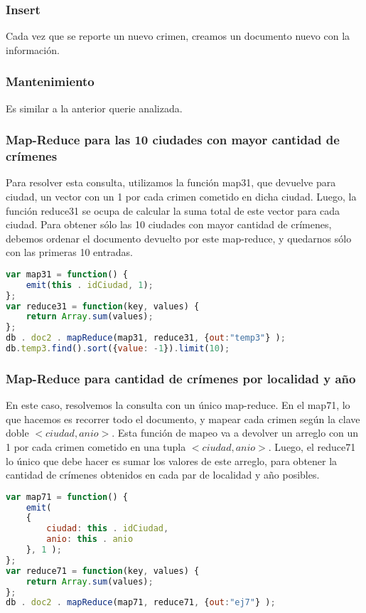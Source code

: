 \documentclass[11pt, a4paper]{article}
\begin{document}
\subsubsection{Insert}

Cada vez que se reporte un nuevo crimen, creamos un documento nuevo con la informaci\'on.

\subsubsection{Mantenimiento}

Es similar a la anterior querie analizada.

\subsubsection{Map-Reduce para las 10 ciudades con mayor cantidad de crímenes}

Para resolver esta consulta, utilizamos la función map31, que devuelve para ciudad, un vector con un 1 por cada crimen cometido en dicha ciudad. Luego, la función reduce31 se ocupa de calcular la suma total de este vector para cada ciudad. Para obtener sólo las 10 ciudades con mayor cantidad de crímenes, debemos ordenar el documento devuelto por este map-reduce, y quedarnos sólo con las primeras 10 entradas.

\begin{lstlisting}[language=JavaScript]
var map31 = function() {
    emit(this . idCiudad, 1);
};
var reduce31 = function(key, values) {
    return Array.sum(values);
};
db . doc2 . mapReduce(map31, reduce31, {out:"temp3"} );
db.temp3.find().sort({value: -1}).limit(10);
\end{lstlisting}

\subsubsection{Map-Reduce para cantidad de crímenes por localidad y año}

En este caso, resolvemos la consulta con un único map-reduce. En el map71, lo que hacemos es recorrer todo el documento, y mapear cada crimen según la clave doble $<ciudad, anio>$. Esta función de mapeo va a devolver un arreglo con un 1 por cada crimen cometido en una tupla $<ciudad, anio>$. Luego, el reduce71 lo único que debe hacer es sumar los valores de este arreglo, para obtener la cantidad de crímenes obtenidos en cada par de localidad y año posibles.

\begin{lstlisting}[language=JavaScript]
var map71 = function() {
    emit( 
    {
        ciudad: this . idCiudad, 
        anio: this . anio
    }, 1 );
};
var reduce71 = function(key, values) {
    return Array.sum(values);
};
db . doc2 . mapReduce(map71, reduce71, {out:"ej7"} );
\end{lstlisting}
\end{document}
